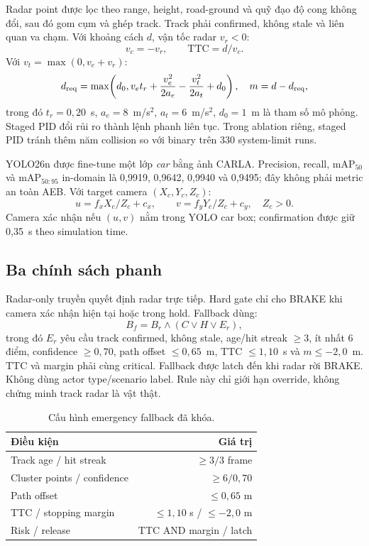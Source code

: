 \documentclass[conference]{IEEEtran}
\begin{document}
Radar point được lọc theo range, height, road-ground và quỹ đạo độ cong không
đổi, sau đó gom cụm và ghép track. Track phải confirmed, không stale và liên
quan va chạm. Với khoảng cách $d$, vận tốc radar $v_r<0$:
\begin{equation}
 v_c=-v_r,\qquad \mathrm{TTC}=d/v_c.
\end{equation}
Với $v_t=\max(0,v_e+v_r)$:
\begin{equation}
 d_{\rm req}=\max\!\left(d_0,v_et_r+\frac{v_e^2}{2a_e}-
 \frac{v_t^2}{2a_t}+d_0\right),\quad m=d-d_{\rm req},
\end{equation}
trong đó $t_r=0,20$~s, $a_e=8$~m/s$^2$, $a_t=6$~m/s$^2$, $d_0=1$~m là tham số
mô phỏng. Staged PID đổi rủi ro thành lệnh phanh liên tục. Trong ablation riêng,
staged PID tránh thêm năm collision so với binary trên 330 system-limit runs.

YOLO26n được fine-tune một lớp \emph{car} bằng ảnh CARLA. Precision, recall,
$\mathrm{mAP}_{50}$ và $\mathrm{mAP}_{50:95}$ in-domain là 0,9919, 0,9642,
0,9940 và 0,9495; đây không phải metric an toàn AEB. Với target camera
$(X_c,Y_c,Z_c)$:
\begin{equation}
 u=f_xX_c/Z_c+c_x,\qquad v=f_yY_c/Z_c+c_y,\quad Z_c>0.
\end{equation}
Camera xác nhận nếu $(u,v)$ nằm trong YOLO car box; confirmation được giữ 0,35~s
theo simulation time.

\subsection{Ba chính sách phanh}
Radar-only truyền quyết định radar trực tiếp. Hard gate chỉ cho BRAKE khi camera
xác nhận hiện tại hoặc trong hold. Fallback dùng:
\begin{equation}
 B_f=B_r\land(C\lor H\lor E_r),
\end{equation}
trong đó $E_r$ yêu cầu track confirmed, không stale, age/hit streak $\geq3$, ít
nhất 6 điểm, confidence $\geq0,70$, path offset $\leq0,65$~m,
TTC $\leq1,10$~s và $m\leq-2,0$~m. TTC và margin phải cùng critical. Fallback
được latch đến khi radar rời BRAKE. Không dùng actor type/scenario label. Rule
này chỉ giới hạn override, không chứng minh track radar là vật thật.

\begin{table}[t]
\caption{Cấu hình emergency fallback đã khóa.}
\centering\footnotesize
\begin{tabular}{lr}
\toprule Điều kiện & Giá trị\\ \midrule
Track age / hit streak & $\geq3/3$ frame\\
Cluster points / confidence & $\geq6/0,70$\\
Path offset & $\leq0,65$ m\\
TTC / stopping margin & $\leq1,10$ s / $\leq-2,0$ m\\
Risk / release & TTC AND margin / latch\\
\bottomrule
\end{tabular}
\end{table}
\end{document}
